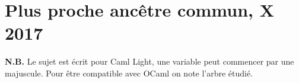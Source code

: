 
\usepackage{enumitem}
\def\numero{Révisions 4}
\def\classe{Option info MP1}
\def \A{{\cal A}}
\def \O#1{{\cal O}\left(#1\right)}
\renewcommand*{\arraystretch}{1.2}
\camltrue

\chapter{Plus proche ancêtre commun, X 2017}
{\bf N.B.} Le sujet est écrit pour {\sc Caml Light}, une variable peut commencer par une majuscule. Pour être compatible avec {\sc OCaml} on note  l'arbre étudié.
